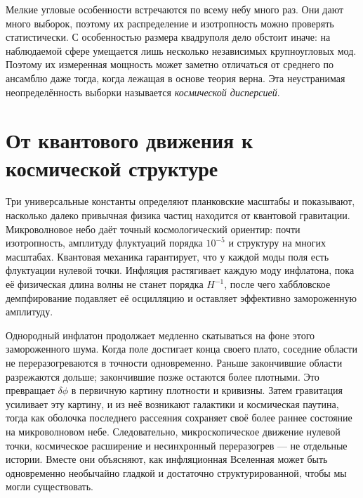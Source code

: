 Мелкие угловые особенности встречаются по всему небу много раз. Они дают много выборок, поэтому их распределение и изотропность можно проверять статистически. С особенностью размера квадруполя дело обстоит иначе: на наблюдаемой сфере умещается лишь несколько независимых крупноугловых мод. Поэтому их измеренная мощность может заметно отличаться от среднего по ансамблю даже тогда, когда лежащая в основе теория верна. Эта неустранимая неопределённость выборки называется \emph{космической дисперсией}.

\begin{classroomqa}
\end{classroomqa}

\section{От квантового движения к космической структуре}

Три универсальные константы определяют планковские масштабы и показывают, насколько далеко привычная физика частиц находится от квантовой гравитации. Микроволновое небо даёт точный космологический ориентир: почти изотропность, амплитуду флуктуаций порядка \(10^{-5}\) и структуру на многих масштабах. Квантовая механика гарантирует, что у каждой моды поля есть флуктуации нулевой точки. Инфляция растягивает каждую моду инфлатона, пока её физическая длина волны не станет порядка \(H^{-1}\), после чего хаббловское демпфирование подавляет её осцилляцию и оставляет эффективно замороженную амплитуду.

Однородный инфлатон продолжает медленно скатываться на фоне этого замороженного шума. Когда поле достигает конца своего плато, соседние области не переразогреваются в точности одновременно. Раньше закончившие области разрежаются дольше; закончившие позже остаются более плотными. Это превращает \(\delta\phi\) в первичную картину плотности и кривизны. Затем гравитация усиливает эту картину, и из неё возникают галактики и космическая паутина, тогда как оболочка последнего рассеяния сохраняет своё более раннее состояние на микроволновом небе. Следовательно, микроскопическое движение нулевой точки, космическое расширение и несинхронный переразогрев — не отдельные истории. Вместе они объясняют, как инфляционная Вселенная может быть одновременно необычайно гладкой и достаточно структурированной, чтобы мы могли существовать.